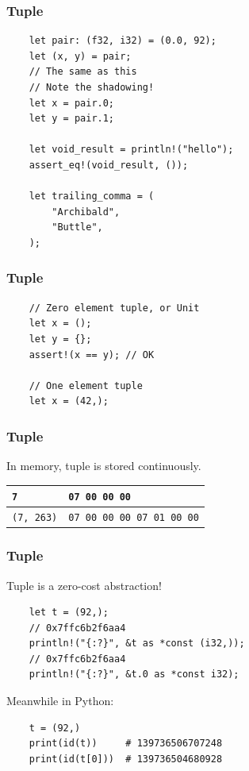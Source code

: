 \documentclass[aspectratio=1610,t]{beamer}
\begin{document}

\begin{frame}[fragile]
\frametitle{Tuple}
\begin{verbatim}
    let pair: (f32, i32) = (0.0, 92);
    let (x, y) = pair;
    // The same as this
    // Note the shadowing!
    let x = pair.0;
    let y = pair.1;

    let void_result = println!("hello");
    assert_eq!(void_result, ());

    let trailing_comma = (
        "Archibald",
        "Buttle",
    );
\end{verbatim}
\end{frame}


\begin{frame}[fragile]
\frametitle{Tuple}
\begin{verbatim}
    // Zero element tuple, or Unit
    let x = ();
    let y = {};
    assert!(x == y); // OK

    // One element tuple
    let x = (42,);
\end{verbatim}
\end{frame}


\begin{frame}[fragile]
\frametitle{Tuple}
In memory, tuple is stored continuously.

\begin{table}[]
\begin{tabular}{|l|l|}
\hline
\texttt{7}        & \texttt{07 00 00 00}             \\ \hline
\texttt{(7, 263)} & \texttt{07 00 00 00 07 01 00 00} \\ \hline
\end{tabular}
\end{table}
\end{frame}


\begin{frame}[fragile]
\frametitle{Tuple}
Tuple is a zero-cost abstraction!

\begin{verbatim}
    let t = (92,);
    // 0x7ffc6b2f6aa4
    println!("{:?}", &t as *const (i32,));
    // 0x7ffc6b2f6aa4
    println!("{:?}", &t.0 as *const i32);
\end{verbatim}

Meanwhile in Python:

\begin{verbatim}
    t = (92,)
    print(id(t))     # 139736506707248
    print(id(t[0]))  # 139736504680928
\end{verbatim}
\end{frame}
\end{document}
